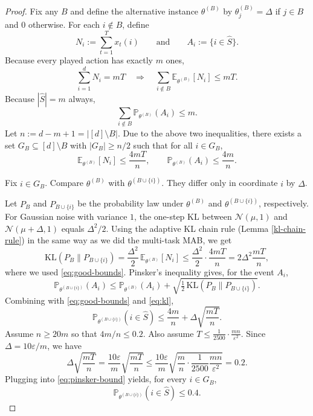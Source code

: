 \begin{proof}
Fix any $B$ and define the alternative instance $\theta^{(B)}$ by
$\theta^{(B)}_j=\Delta$ if $j\in B$ and $0$ otherwise.
For each $i\notin B$, define
\[
N_i:=\sum_{t=1}^T x_t(i)\qquad\text{and}\qquad A_i:=\{i\in \hat S\}.
\]
Because every played action has exactly $m$ ones,
\[
\sum_{i=1}^d N_i=mT \quad\Rightarrow\quad \sum_{i\notin B}\mathbb E_{\theta^{(B)}}[N_i]\le mT.
\]
Because $|\hat S|=m$ always,
\[
\sum_{i\notin B}\mathbb P_{\theta^{(B)}}(A_i)\le m.
\]
Let $n:=d-m+1=|[d]\setminus B|$. Due to the above two inequalities, there exists a set
$G_B\subseteq [d]\setminus B$ with $|G_B|\ge n/2$ such that for all $i\in G_B$,
\begin{equation}\label{eq:good-bounds}
\mathbb E_{\theta^{(B)}}[N_i]\le \frac{4mT}{n},
\qquad
\mathbb P_{\theta^{(B)}}(A_i)\le \frac{4m}{n}.
\end{equation}

Fix $i\in G_B$. Compare $\theta^{(B)}$ with $\theta^{(B\cup\{i\})}$.
They differ only in coordinate $i$ by $\Delta$.

Let $P_B$ and $P_{B\cup\{i\}}$ be the probability law under
$\theta^{(B)}$ and $\theta^{(B\cup\{i\})}$, respectively.
For Gaussian noise with variance $1$, the one-step KL between $\mathcal N(\mu,1)$ and $\mathcal N(\mu+\Delta,1)$
equals $\Delta^2/2$.
Using the adaptive KL chain rule (Lemma \ref{kl-chain-rule}) in the same way as we did the multi-task MAB, we get
\begin{equation}\label{eq:kl}
\mathrm{KL}(P_B\|P_{B\cup\{i\}})
=\frac{\Delta^2}{2}\,\mathbb E_{\theta^{(B)}}[N_i]
\le \frac{\Delta^2}{2}\cdot \frac{4mT}{n}
=2\Delta^2\frac{mT}{n},
\end{equation}
where we used \eqref{eq:good-bounds}.
Pinsker's inequality gives, for the event $A_i$,
\[
\mathbb P_{\theta^{(B\cup\{i\})}}(A_i)
\le \mathbb P_{\theta^{(B)}}(A_i) + \sqrt{\tfrac12\,\mathrm{KL}(P_B\|P_{B\cup\{i\}})}.
\]
Combining with \eqref{eq:good-bounds} and \eqref{eq:kl},
\begin{equation}\label{eq:pinsker-bound}
\mathbb P_{\theta^{(B\cup\{i\})}}(i\in \hat S)
\le \frac{4m}{n} + \Delta\sqrt{\frac{mT}{n}}.
\end{equation}
Assume $n\ge 20m$ so that $4m/n\le 0.2$.
Also assume  $T \le \frac{1}{2500}\cdot \frac{mn}{\varepsilon^2}.$ Since $\Delta=10\varepsilon/m$, we have
\[
\Delta\sqrt{\frac{mT}{n}}
=\frac{10\varepsilon}{m}\sqrt{\frac{mT}{n}}
\le \frac{10\varepsilon}{m}\sqrt{\frac{m}{n}\cdot \frac{1}{2500}\frac{mn}{\varepsilon^2}}
=0.2.
\]
Plugging into \eqref{eq:pinsker-bound} yields, for every $i\in G_B$,
\begin{equation}\label{eq:good-i-prob}
\mathbb P_{\theta^{(B\cup\{i\})}}(i\in \hat S)\le 0.4.
\end{equation}


\end{proof}
